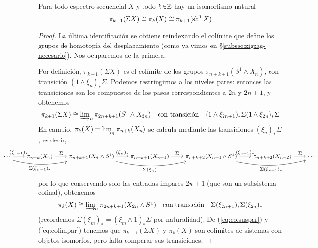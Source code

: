 \begin{prop}\label{prop:pi-suspension}
Para todo espectro secuencial $X$ y todo $k\en\mathbb Z$ hay un isomorfismo natural
\[
\pi_{k+1}(\Sigma X)\cong\pi_k(X)\cong\pi_{k+1}(\operatorname{sh}^1X)
\]
\end{prop}
\begin{proof}
La última identificación se obtiene reindexando el colímite que define los grupos de homotopía del desplazamiento (como ya vimos en \S \ref{subsec:zigzag-necesario}). Nos ocuparemos de la primera. 

Por definición, $\pi_{k+1}(\Sigma X)$ es el colímite de los grupos $\pi_{n+k+1}(S^1\wedge X_n)$, con transición $(1\wedge\xi_n)_*\Sigma$. Podemos restringirnos a los niveles pares: entonces las transiciones son los compuestos de los pasos correspondientes a $2n$ y $2n+1$, y obtenemos
\begin{equation}\label{eq:colsuspar}\textstyle
\pi_{k+1}(\Sigma X)\cong\varinjlim\nolimits_n\pi_{2n+k+1}(S^1\wedge X_{2n})
\quad\text{con transición}\quad
(1\wedge\xi_{2n+1})_*\Sigma(1\wedge\xi_{2n})_*\Sigma
\end{equation}
En cambio, $\pi_k(X)=\varinjlim\nolimits_n\pi_{n+k}(X_n)$ se calcula mediante las transiciones $(\xi_n)_* \Sigma$, es decir,
\[
\makebox[\textwidth]{%
\begin{tikzcd}[
    ampersand replacement=\&,
    column sep = 1.8em, 
    cells={font=\footnotesize, inner sep=0pt}, 
    every label={font=\scriptscriptsize}, 
    cramped
]
	{\phantom{\pi_{n+k}(X_n)}\cdots} \& {\pi_{n+k}(X_n)} \& {\pi_{n+k+1}(X_n\wedge S^1)} \& {\pi_{n+k+1}(X_{n+1})} \& {\pi_{n+k+2}(X_{n+1}\wedge S^1)} \& {\pi_{n+k+2}(X_{n+2})} \& {\cdots\phantom{\pi_{n+k}(X_n)}}
	\arrow["{(\xi_{n-1})_*}", from=1-1, to=1-2]
	\arrow["{\Sigma(\xi_{n-1})_*}"', bend right=12, from=1-1, to=1-3]
	\arrow["\Sigma", from=1-2, to=1-3]
	\arrow["{(\xi_n)_*}", from=1-3, to=1-4]
	\arrow["{\Sigma(\xi_n)_*}"', bend right=12, from=1-3, to=1-5]
	\arrow["\Sigma", from=1-4, to=1-5]
    \arrow["{\Sigma(\xi_{n+1})_*}"', bend right=12, from=1-5, to=1-7]
	\arrow["{(\xi_{n+1})_*}", from=1-5, to=1-6]
    \arrow["\Sigma", from=1-6, to=1-7]
\end{tikzcd}
}
\]
por lo que conservando solo las entradas impares $2n+1$ (que son un subsistema cofinal), obtenemos
\begin{equation}\label{eq:colimpar}\textstyle
\pi_k(X)\cong\varinjlim\nolimits_n\pi_{2n+k+1}(X_{2n}\wedge S^1)
\quad\text{con transición}\quad
\Sigma(\xi_{2n+1})_*\Sigma(\xi_{2n})_*
\end{equation}
(recordemos $\Sigma (\xi_m)_*=(\xi_m\wedge1)_* \Sigma$ por naturalidad). De (\ref{eq:colsuspar}) y (\ref{eq:colimpar}) tenemos que $\pi_{k+1}(\Sigma X)$ y $\pi_{k}(X)$ son colímites de sistemas con objetos isomorfos, pero falta comparar sus transiciones.


\end{proof}
